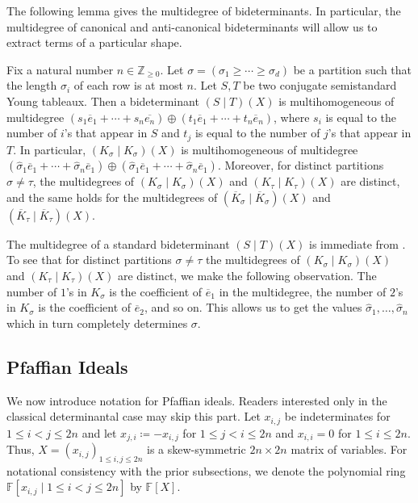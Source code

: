 \documentclass[10pt,a4paper]{amsart}
\newcommand*\Z{\mathbb{Z}}
\newcommand*\F{\mathbb{F}}
\newcommand*\defeq{\coloneqq}
\begin{document}
The following lemma gives the multidegree of bideterminants.
In particular, the multidegree of canonical and anti-canonical bideterminants will allow us to extract terms of a particular shape.
\begin{lem}\label{lem:canonical_degs}
    Fix a natural number $n \in \Z_{\geq 0}$.
    Let $\sigma = (\sigma_1 \geq \cdots \geq \sigma_d)$ be a partition such that the length $\sigma_i$ of each row is at most $n$.
    Let $S, T$ be two conjugate semistandard Young tableaux.
    Then a bideterminant $(S \mid T)(X)$ is multihomogeneous of multidegree $(s_1 \overline{e}_1 + \cdots + s_n \overline{e_n}) \oplus (t_1 \overline{e}_1 + \cdots + t_n \overline{e}_n)$, where $s_i$ is equal to the number of $i$'s that appear in $S$ and $t_j$ is equal to the number of $j$'s that appear in $T$.
    In particular, $(K_\sigma \mid K_\sigma)(X)$ is multihomogeneous of multidegree $(\widehat{\sigma}_1 \overline{e}_1 + \cdots + \widehat{\sigma}_n \overline{e}_1) \oplus (\widehat{\sigma}_1 \overline{e}_1 + \cdots + \widehat{\sigma}_n \overline{e}_1)$.
    Moreover, for distinct partitions $\sigma \neq \tau$, the multidegrees of $(K_\sigma \mid K_\sigma)(X)$ and $(K_\tau \mid K_\tau)(X)$ are distinct, and the same holds for the multidegrees of $(\overline{K}_\sigma \mid \overline{K}_\sigma)(X)$ and $(\overline{K}_\tau \mid \overline{K}_\tau)(X)$. 
\end{lem}
\begin{pf}
    The multidegree of a standard bideterminant $(S \mid T)(X)$ is immediate from .
    To see that for distinct partitions $\sigma \neq \tau$ the multidegrees of $(K_\sigma \mid K_\sigma)(X)$ and $(K_\tau \mid K_\tau)(X)$ are distinct, we make the following observation.
    The number of $1$'s in $K_{\sigma}$ is the coefficient of $\overline{e}_1$ in the multidegree, the number of $2$'s in $K_{\sigma}$ is the coefficient of $\overline{e}_2$, and so on.
    This allows us to get the values $\widehat{\sigma}_1, \ldots, \widehat{\sigma}_n$ which in turn completely determines $\sigma$.
\end{pf}

\subsection{Pfaffian Ideals} 

We now introduce notation for Pfaffian ideals.
Readers interested only in the classical determinantal case may skip this part.
Let $x_{i, j}$ be indeterminates for $1 \leq i < j \leq 2n$ and let $x_{j, i} \defeq -x_{i, j}$ for $1 \leq j < i \leq 2n$ and $x_{i, i} = 0$ for $1 \leq i \leq 2n$.
Thus, $X = (x_{i, j})_{1 \leq i, j \leq 2n}$ is a skew-symmetric $2n \times 2n$ matrix of variables.
For notational consistency with the prior subsections, we denote the polynomial ring $\F[x_{i, j} \mid 1 \leq i < j \leq 2n]$ by $\F[X]$.
\end{document}
